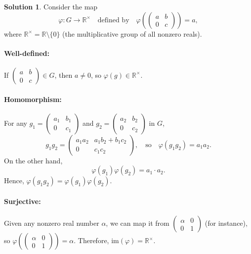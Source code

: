 \documentclass[12pt]{article}
\theoremstyle{definition} %
\newtheorem{solution}{Solution}
\theoremstyle{plain} %
\begin{document}
\begin{solution}
Consider the map
\[
\varphi : G \to \mathbb{R}^\times
\quad\text{defined by}\quad
\varphi\left(
\begin{pmatrix}
a & b \\
0 & c
\end{pmatrix}
\right) = a,
\]
where \( \mathbb{R}^\times = \mathbb{R} \setminus \{0\} \) (the multiplicative group of all nonzero reals).

\paragraph{Well-defined:} If \( \begin{pmatrix} a & b \\ 0 & c \end{pmatrix} \in G \), then \( a \neq 0 \), so \( \varphi(g) \in \mathbb{R}^\times \).

\paragraph{Homomorphism:} For any 
\( g_1 = \begin{pmatrix} a_1 & b_1 \\ 0 & c_1 \end{pmatrix} \) and 
\( g_2 = \begin{pmatrix} a_2 & b_2 \\ 0 & c_2 \end{pmatrix} \) in \( G \),
\[
g_1 g_2 = 
\begin{pmatrix}
a_1 a_2 & a_1 b_2 + b_1 c_2 \\
0 & c_1 c_2
\end{pmatrix},
\quad\text{so}\quad
\varphi(g_1 g_2) = a_1 a_2.
\]
On the other hand,
\[
\varphi(g_1) \varphi(g_2) = a_1 \cdot a_2.
\]
Hence, \( \varphi(g_1 g_2) = \varphi(g_1) \varphi(g_2) \).

\paragraph{Surjective:} Given any nonzero real number \( \alpha \), we can map it from
\( \begin{pmatrix} \alpha & 0 \\ 0 & 1 \end{pmatrix} \) (for instance), so 
\( \varphi\left( \begin{pmatrix} \alpha & 0 \\ 0 & 1 \end{pmatrix} \right) = \alpha \).  
Therefore, \( \mathrm{im}(\varphi) = \mathbb{R}^\times \).


\end{solution}
\end{document}
